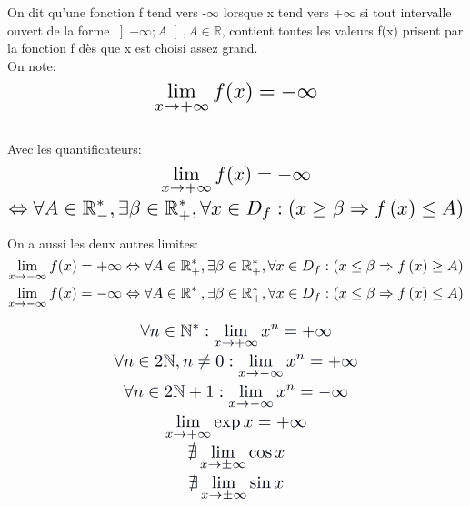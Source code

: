 \documentclass[a4paper, 10pt]{article}
\renewcommand{\large}{\color{text}}
\renewcommand{\textbf}{\color{crimson}}
\begin{document}
	\newpage
	\textbf{Définition:}
	\large On dit qu'une fonction f tend vers -$\infty$ lorsque x tend vers +$\infty$
	si tout intervalle ouvert de la forme $\left]-\infty; A\right[, A\in\mathbb{R}$, contient toutes les valeurs f(x)
	prisent par la fonction f dès que x est choisi assez grand.\\
	On note:
	\begin{displaymath}
		\scaleto{\lim_{x\to+\infty} f(x) = -\infty}{25pt}
	\end{displaymath}
	\\
	\large Avec les quantificateurs:
	\begin{gather*}
		\scaleto{\lim_{x\to+\infty} f(x) = -\infty}{25pt} 
		\\
		\scaleto{\Leftrightarrow\forall A \in\mathbb{R}_{-}^{*},\exists\beta\in\mathbb{R}_{+}^{*},\forall x \in D_{f} : \left(x\geq\beta\Rightarrow f\left(x\right)\leq A \right)}{18pt}
	\end{gather*}

	
	\begin{center}
		\vspace{30pt}
		\small On a aussi les deux autres limites:
		\begin{gather*}
			\scaleto{\lim_{x\to-\infty} f(x) = +\infty\Leftrightarrow\forall A \in\mathbb{R}_{+}^{*},\exists\beta\in\mathbb{R}_{+}^{*},\forall x \in D_{f} : \left(x\leq\beta\Rightarrow f\left(x\right)\geq A \right)}{18pt}
			\\
			\scaleto{\lim_{x\to-\infty} f(x) = -\infty\Leftrightarrow\forall A \in\mathbb{R}_{-}^{*},\exists\beta\in\mathbb{R}_{+}^{*},\forall x \in D_{f} : \left(x\leq\beta\Rightarrow f\left(x\right)\leq A \right)}{18pt}
		\end{gather*}
	\end{center}

	\vspace{30pt}
	\textbf{Propriétés (Admises):}
	\begin{gather}
		\color{text} \scaleto{\forall n\in\mathbb{N}^{*}: \lim_{x\to+\infty}x^{n}=+\infty}{20pt} \label{xn} 
		\\ \color{text} \scaleto{\forall n\in2\mathbb{N}, n\neq0: \lim_{x\to-\infty}x^{n}=+\infty}{20pt}
		\\ \color{text} \scaleto{\forall n\in2\mathbb{N}+1: \lim_{x\to-\infty}x^{n}=-{\infty}}{20pt}
		\\ \color{text} \scaleto{\lim_{x\to+\infty}\exp{x}=+\infty}{20pt}
		\\ \color{text} \scaleto{\nexists\lim_{x\to\pm\infty}\cos{x}}{20pt} 
		\\ \color{text} \scaleto{\nexists\lim_{x\to\pm\infty}\sin{x}}{20pt}
	\end{gather}
\end{document}
